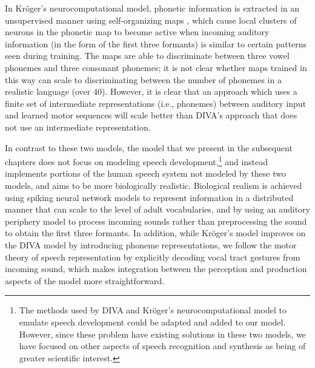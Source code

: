 In Kr\"{o}ger's neurocomputational model,
phonetic information is extracted
in an unsupervised manner
using self-organizing maps
\citep{kohonen1982,kohonen2007},
which cause
local clusters of neurons
in the phonetic map to become active
when incoming auditory information
(in the form of the first three formants)
is similar to certain patterns
seen during training.
The maps are able to
discriminate between three vowel phonemes
and three consonant phonemes;
it is not clear whether
maps trained in this way
can scale to discriminating
between the number of phonemes
in a realistic language (over 40).
However, it is clear that an approach
which uses a finite set of intermediate representations
(i.e., phonemes)
between auditory input
and learned motor sequences
will scale better than DIVA's approach
that does not use an intermediate representation.

In contrast to these two models,
the model that we present
in the subsequent chapters does not focus on
modeling speech development,\footnote{
  The methods used by DIVA and Kr\"{o}ger's
  neurocomputational model to emulate
  speech development could be adapted
  and added to our model.
  However, since these problem have existing
  solutions in these two models,
  we have focused on other aspects
  of speech recognition and synthesis
  as being of greater scientific interest.}
and instead implements
portions of the human speech system
not modeled by these two models,
and aims to be more biologically realistic.
Biological realism is achieved
using spiking neural network models
to represent information
in a distributed manner
that can scale to the level
of adult vocabularies,
and by using an auditory periphery model
to process incoming sounds
rather than preprocessing the sound
to obtain the first three formants.
In addition, while Kr\"{o}ger's model
improves on the DIVA model by
introducing phoneme representations,
we follow the motor theory
of speech representation by
explicitly decoding vocal tract gestures
from incoming sound,
which makes integration between
the perception and production aspects
of the model more straightforward.
